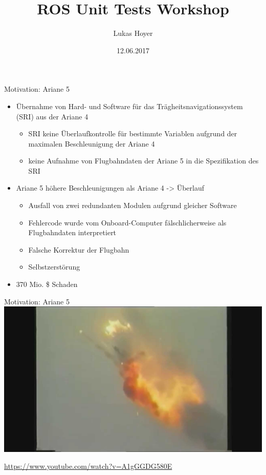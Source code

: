 \documentclass{beamer}
\title{ROS Unit Tests Workshop}
\author{Lukas Hoyer}
\institute[]{Otto-von-Guericke-Universität Magdeburg}
\date{12.06.2017}
\begin{document}
\maketitle

\begin{frame}{Motivation: Ariane 5}
\begin{itemize}
	\item Übernahme von Hard- und Software für das
Trägheitsnavigationssystem (SRI) aus der Ariane 4
	\begin{itemize}
		\item SRI keine Überlaufkontrolle für bestimmte Variablen aufgrund der maximalen Beschleunigung der Ariane 4
		\item keine Aufnahme von Flugbahndaten der Ariane 5 in die Spezifikation des SRI	
	\end{itemize}
	\pause
	\item Ariane 5 höhere Beschleunigungen als Ariane 4 -> Überlauf
	\begin{itemize}
		\item Ausfall von zwei redundanten Modulen aufgrund gleicher Software
		\item Fehlercode wurde vom Onboard-Computer fälschlicherweise als Flugbahndaten interpretiert
		\item Falsche Korrektur der Flugbahn
		\item Selbstzerstörung
	\end{itemize}
	\pause
	\item 370 Mio. \$ Schaden
\end{itemize}
\end{frame}

\begin{frame}{Motivation: Ariane 5}
	\includegraphics[width=\textwidth]{img/ariane5.jpg}

	\url{https://www.youtube.com/watch?v=A1gGGDG580E}
\end{frame}
\end{document}
